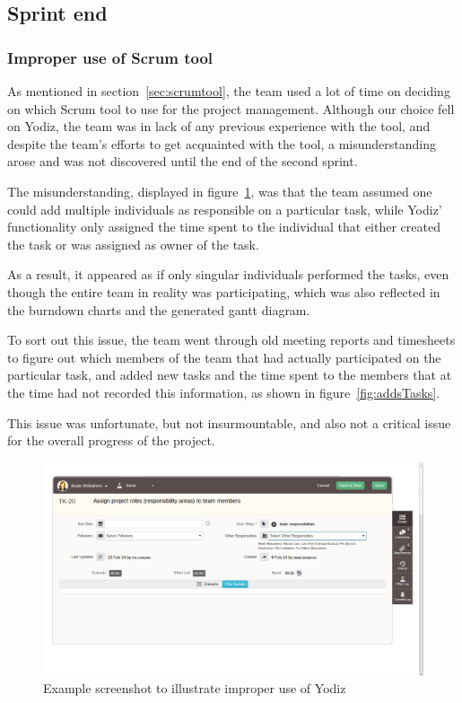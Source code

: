 \subsection{Sprint end}

\subsubsection{Improper use of Scrum tool}
\label{sec:improperScrum}
As mentioned in section~\ref{sec:scrumtool}, the team used a lot of time on
deciding on which Scrum tool to use for the project management. Although our
choice fell on Yodiz, the team was in lack of any previous experience with the
tool, and despite the team's efforts to get acquainted with the tool, a
misunderstanding arose and was not discovered until the end of the second
sprint.

The misunderstanding, displayed in figure~\ref{fig:wrongUse}, was that the team
assumed one could add multiple individuals as responsible on a particular task,
while Yodiz' functionality only assigned the time spent to the individual that
either created the task or was assigned as owner of the task.

As a result, it appeared as if only singular individuals performed the tasks,
even though the entire team in reality was participating, which was also
reflected in the burndown charts and the generated gantt diagram. 

To sort out this issue, the team went through old meeting reports and timesheets
to figure out which members of the team that had actually participated on the
particular task, and added new tasks and the time spent to the members that at
the time had not recorded this information, as shown in
figure~\ref{fig:addsTasks}.

This issue was unfortunate, but not insurmountable, and also not a critical
issue for the overall progress of the project.

\begin{figure}[H]
\includegraphics[width=\textwidth]{ch/devProcess/fig/wrongUse.png}
\caption{Example screenshot to illustrate improper use of Yodiz}
\label{fig:wrongUse}
\end{figure}

